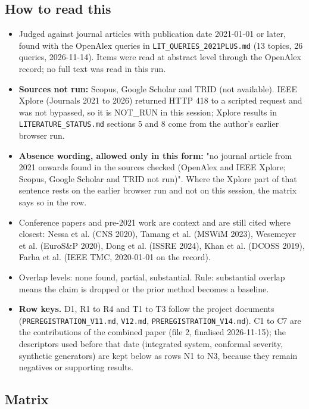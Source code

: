 


\subsection*{How to read this}

\begin{itemize}
\item Judged against journal articles with publication date 2021-01-01 or later, found with the OpenAlex queries in \texttt{LIT\_QUERIES\_2021PLUS.md} (13 topics, 26 queries, 2026-11-14). Items were read at abstract level through the OpenAlex record; no full text was read in this run.
\item \textbf{Sources not run:} Scopus, Google Scholar and TRID (not available). IEEE Xplore (Journals 2021 to 2026) returned HTTP 418 to a scripted request and was not bypassed, so it is NOT\_RUN in this session; Xplore results in \texttt{LITERATURE\_STATUS.md} sections 5 and 8 come from the author's earlier browser run.
\item \textbf{Absence wording, allowed only in this form:} "no journal article from 2021 onwards found in the sources checked (OpenAlex and IEEE Xplore; Scopus, Google Scholar and TRID not run)". Where the Xplore part of that sentence rests on the earlier browser run and not on this session, the matrix says so in the row.
\item Conference papers and pre-2021 work are context and are still cited where closest: Nessa et al. (CNS 2020), Tamang et al. (MSWiM 2023), Wesemeyer et al. (EuroS\&P 2020), Dong et al. (ISSRE 2024), Khan et al. (DCOSS 2019), Farha et al. (IEEE TMC, 2020-01-01 on the record).
\item Overlap levels: none found, partial, substantial. Rule: substantial overlap means the claim is dropped or the prior method becomes a baseline.
\item \textbf{Row keys.} D1, R1 to R4 and T1 to T3 follow the project documents (\texttt{PREREGISTRATION\_V11.md}, \texttt{V12.md}, \texttt{PREREGISTRATION\_V14.md}). C1 to C7 are the contributions of the combined paper (file 2, finalised 2026-11-15); the descriptors used before that date (integrated system, conformal severity, synthetic generators) are kept below as rows N1 to N3, because they remain negatives or supporting results.
\end{itemize}

\subsection*{Matrix}

